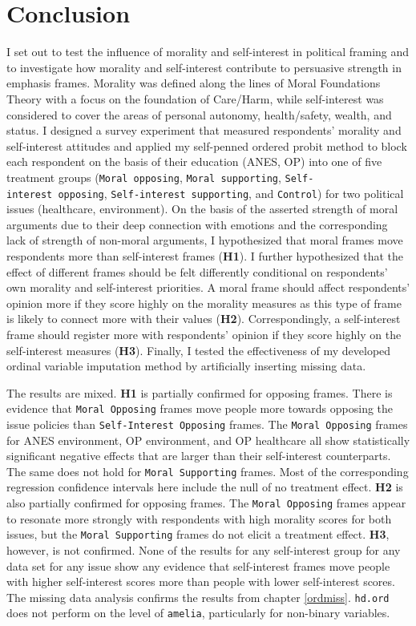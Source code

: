\documentclass[12pt,econ]{sources/authesis}
\begin{document}
\hypertarget{framing-conclusion}{%
\section{Conclusion}\label{framing-conclusion}}

I set out to test the influence of morality and self-interest in political framing and to investigate how morality and self-interest contribute to persuasive strength in emphasis frames. Morality was defined along the lines of Moral Foundations Theory with a focus on the foundation of Care/Harm, while self-interest was considered to cover the areas of personal autonomy, health/safety, wealth, and status. I designed a survey experiment that measured respondents' morality and self-interest attitudes and applied my self-penned ordered probit method to block each respondent on the basis of their education (ANES, OP) into one of five treatment groups (\texttt{Moral\ opposing}, \texttt{Moral\ supporting}, \texttt{Self-interest\ opposing}, \texttt{Self-interest\ supporting}, and \texttt{Control}) for two political issues (healthcare, environment). On the basis of the asserted strength of moral arguments due to their deep connection with emotions and the corresponding lack of strength of non-moral arguments, I hypothesized that moral frames move respondents more than self-interest frames (\textbf{H1}). I further hypothesized that the effect of different frames should be felt differently conditional on respondents' own morality and self-interest priorities. A moral frame should affect respondents' opinion more if they score highly on the morality measures as this type of frame is likely to connect more with their values (\textbf{H2}). Correspondingly, a self-interest frame should register more with respondents' opinion if they score highly on the self-interest measures (\textbf{H3}). Finally, I tested the effectiveness of my developed ordinal variable imputation method by artificially inserting missing data.

The results are mixed. \textbf{H1} is partially confirmed for opposing frames. There is evidence that \texttt{Moral\ Opposing} frames move people more towards opposing the issue policies than \texttt{Self-Interest\ Opposing} frames. The \texttt{Moral\ Opposing} frames for ANES environment, OP environment, and OP healthcare all show statistically significant negative effects that are larger than their self-interest counterparts. The same does not hold for \texttt{Moral\ Supporting} frames. Most of the corresponding regression confidence intervals here include the null of no treatment effect. \textbf{H2} is also partially confirmed for opposing frames. The \texttt{Moral\ Opposing} frames appear to resonate more strongly with respondents with high morality scores for both issues, but the \texttt{Moral\ Supporting} frames do not elicit a treatment effect. \textbf{H3}, however, is not confirmed. None of the results for any self-interest group for any data set for any issue show any evidence that self-interest frames move people with higher self-interest scores more than people with lower self-interest scores. The missing data analysis confirms the results from chapter \ref{ordmiss}. \texttt{hd.ord} does not perform on the level of \texttt{amelia}, particularly for non-binary variables.
\end{document}
